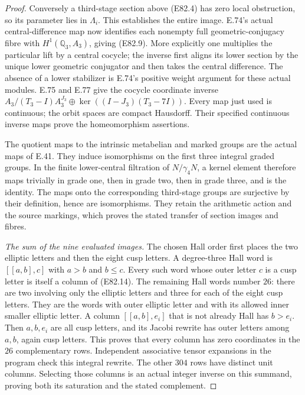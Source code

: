 \begin{proof}
Conversely a third-stage section above (E82.4)
has zero local obstruction, so its parameter lies
in $\Lambda_i$. This establishes the entire image.
E.74's actual central-difference map now identifies
each nonempty full geometric-conjugacy fibre with
$H^1(\mathbb Q_3,A_3)$, giving (E82.9).
More explicitly one multiplies the particular lift
by a central cocycle; the inverse first aligns its
lower section by the unique lower geometric
conjugator and then takes the central difference.
The absence of a lower stabilizer is E.74's positive
weight argument for these actual modules. E.75 and
E.77 give the cocycle coordinate inverse
$A_3/(T_3-I)A_3^{J_3}\oplus
\ker((I-J_3)(T_3-7I))$.
Every map just used is continuous; the orbit spaces
are compact Hausdorff. Their specified continuous
inverse maps prove the homeomorphism assertions.

The quotient maps to the intrinsic metabelian and
marked groups are the actual maps of E.41. They
induce isomorphisms on the first three integral
graded groups. In the finite lower-central
filtration of $N/\gamma_4N$, a kernel element
therefore maps trivially in grade one, then in
grade two, then in grade three, and is the
identity. The maps onto the corresponding
third-stage groups are surjective by their
definition, hence are isomorphisms. They retain
the arithmetic action and the source markings,
which proves the stated transfer of section
images and fibres.

\emph{The sum of the nine evaluated images.}
The chosen Hall order first places the two elliptic
letters and then the eight cusp letters. A degree-three
Hall word is $[[a,b],c]$ with $a>b$ and $b\le c$.
Every such word whose outer letter $c$ is a cusp
letter is itself a column of (E82.14). The remaining
Hall words number $26$: there are two involving
only the elliptic letters and three for each of
the eight cusp letters. They are the words with
outer elliptic letter and with its allowed inner
smaller elliptic letter. A column $[[a,b],e_i]$ that
is not already Hall has $b>e_i$. Then $a,b,e_i$ are
all cusp letters, and its Jacobi rewrite has outer
letters among $a,b$, again cusp letters. This proves
that every column has zero coordinates in the $26$
complementary rows. Independent associative tensor
expansions in the program check this integral rewrite.
The other $304$ rows have distinct unit
columns. Selecting those columns is an actual
integer inverse on this summand, proving both
its saturation and the stated complement.


\end{proof}

